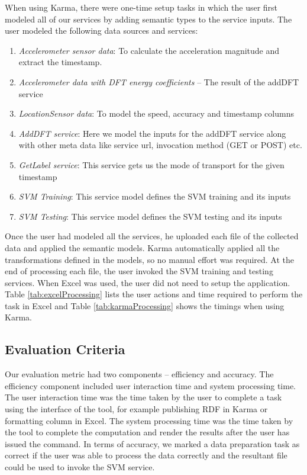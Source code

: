 When using Karma, there were one-time setup tasks in which the user first modeled all of our services by adding semantic types to the service inputs. The user modeled the following data sources and services:
\begin{enumerate}
	\item \textit{Accelerometer sensor data}: To calculate the acceleration magnitude and extract the timestamp.
	\item \textit{Accelerometer data with DFT energy coefficients} – The result of the addDFT service 
	\item \textit{LocationSensor data}: To model the speed, accuracy and timestamp columns
	\item \textit{AddDFT service}: Here we model the inputs for the addDFT service along with other meta data like service url, invocation method (GET or POST) etc.
	\item \textit{GetLabel service}: This service gets us the mode of transport for the given timestamp
	\item \textit{SVM Training}: This service model defines the SVM training and its inputs
	\item \textit{SVM Testing}: This service model defines the SVM testing and its inputs
\end{enumerate} 

Once the user had modeled all the services, he uploaded each file of the collected data and applied the semantic models. Karma automatically applied all the transformations defined in the models, so no manual effort was required. At the end of processing each file, the user invoked the SVM training and testing services. When Excel was used, the user did not need to setup the application. Table \ref{tab:excelProcessing} lists the user actions and time required to perform the task in Excel and Table \ref{tab:karmaProcessing} shows the timings when using Karma.

\subsection{Evaluation Criteria}
Our evaluation metric had two components -- efficiency and accuracy. The efficiency component included user interaction time and system processing time. The user interaction time was the time taken by the user to complete a task using the interface of the tool, for example publishing RDF in Karma or formatting column in Excel. The system processing time was the time taken by the tool to complete the computation and render the results after the user has issued the command. In terms of accuracy, we marked a data preparation task as correct if the user was able to process the data correctly and the resultant file could be used to invoke the SVM service.

